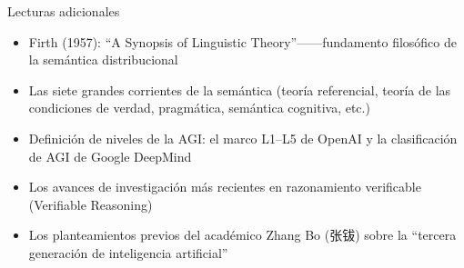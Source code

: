 \documentclass[a4paper]{article}
\begin{document}
\begin{knowledgebox}{Lecturas adicionales}
\begin{itemize}
\item Firth (1957): ``A Synopsis of Linguistic Theory''——fundamento filosófico de la semántica distribucional
\item Las siete grandes corrientes de la semántica (teoría referencial, teoría de las condiciones de verdad, pragmática, semántica cognitiva, etc.)
\item Definición de niveles de la AGI: el marco L1--L5 de OpenAI y la clasificación de AGI de Google DeepMind
\item Los avances de investigación más recientes en razonamiento verificable (Verifiable Reasoning)
\item Los planteamientos previos del académico Zhang Bo (张钹) sobre la ``tercera generación de inteligencia artificial''
\end{itemize}
\end{knowledgebox}

\end{document}
